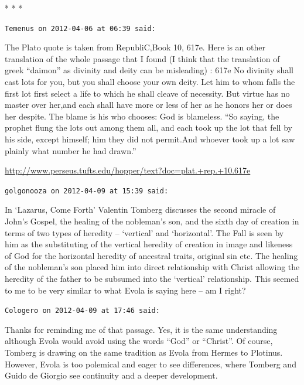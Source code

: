 \begin{center}* * *\end{center}

\begin{footnotesize}
\begin{sffamily}
\texttt{Temenus on 2012-04-06 at 06:39 said:}

The Plato quote is taken from RepubliC,Book 10, 617e. Here is an other translation of the whole passage that I found (I think that the translation of greek ``daimon'' as divinity and deity can be misleading) : 617e No divinity shall cast lots for you, but you shall choose your own deity. Let him to whom falls the first lot first select a life to which he shall cleave of necessity. But virtue has no master over her,and each shall have more or less of her as he honors her or does her despite. The blame is his who chooses: God is blameless. ``So saying, the prophet flung the lots out among them all, and each took up the lot that fell by his side, except himself; him they did not permit.And whoever took up a lot saw plainly what number he had drawn.''

\url{http://www.perseus.tufts.edu/hopper/text?doc=plat.+rep.+10.617e}


\hfill

\texttt{golgonooza on 2012-04-09 at 15:39 said:}

In `Lazarus, Come Forth' Valentin Tomberg discusses the second miracle of John's Gospel, the healing of the nobleman's son, and the sixth day of creation in terms of two types of heredity -- `vertical' and `horizontal'. The Fall is seen by him as the substituting of the vertical heredity of creation in image and likeness of God for the horizontal heredity of ancestral traits, original sin etc. The healing of the nobleman's son placed him into direct relationship with Christ allowing the heredity of the father to be subsumed into the `vertical' relationship. This seemed to me to be very similar to what Evola is saying here -- am I right?

\hfill

\texttt{Cologero on 2012-04-09 at 17:46 said:}

Thanks for reminding me of that passage. Yes, it is the same understanding although Evola would avoid using the words ``God'' or ``Christ''. Of course, Tomberg is drawing on the same tradition as Evola from Hermes to Plotinus. However, Evola is too polemical and eager to see differences, where Tomberg and Guido de Giorgio see continuity and a deeper development.


\end{sffamily}
\end{footnotesize}
